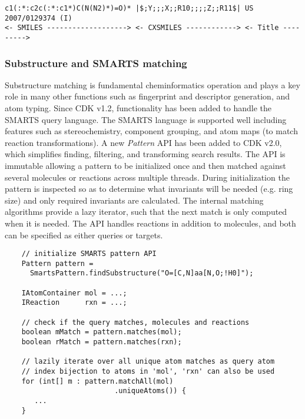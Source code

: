 \documentclass[doublespacing]{bmcart}
\def \cdkversion {v2.0}
\begin{document}
\vspace{0.2cm}
\small
\begin{verbatim}
c1(:*:c2c(:*:c1*)C(N(N2)*)=O)* |$;Y;;;X;;R10;;;;Z;;R11$| US 2007/0129374 (I)
<- SMILES -------------------> <- CXSMILES ------------> <- Title --------->
\end{verbatim}
\normalsize
\vspace{0.2cm}

\subsubsection*{Substructure and SMARTS matching}

Substructure matching is fundamental cheminformatics operation and
plays a key role in many other functions such as fingerprint and
descriptor generation, and atom typing. Since CDK v1.2, functionality
has been added to handle the SMARTS query language. The SMARTS
language is supported well including features such as
stereochemistry, component grouping, and atom
maps (to match reaction transformations). A new \textit{Pattern} API
has been added to CDK \cdkversion{}, which simplifies finding,
filtering, and transforming search results. The API is immutable allowing a
pattern to be initialized once and then matched against several
molecules or reactions across multiple threads. During initialization
the pattern is inspected so as to determine what invariants will be
needed (e.g. ring size) and only required invariants are calculated. The
internal matching algorithms provide a lazy iterator, such that the
next match is only computed when it is needed. The API handles
reactions in addition to molecules, and both can be specified as
either queries or targets.

\vspace{0.2cm}
  \begin{verbatim}
    // initialize SMARTS pattern API
    Pattern pattern = 
      SmartsPattern.findSubstructure("O=[C,N]aa[N,O;!H0]");

    IAtomContainer mol = ...;
    IReaction      rxn = ...;

    // check if the query matches, molecules and reactions
    boolean mMatch = pattern.matches(mol);
    boolean rMatch = pattern.matches(rxn);         

    // lazily iterate over all unique atom matches as query atom
    // index bijection to atoms in 'mol', 'rxn' can also be used
    for (int[] m : pattern.matchAll(mol)
                          .uniqueAtoms()) {
       ...
    }
  \end{verbatim}
\vspace{0.2cm}
\end{document}
